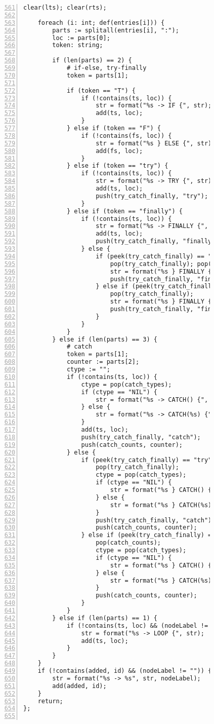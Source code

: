 \begin{figure}[ht!]
\begin{lstlisting}[numbers=left, tabsize=4, escapechar=@, caption={API Usage Mining Analysis},label={lst:aun-code},  firstline = 561, firstnumber = 561, lastline = 621]
	clear(lts); clear(rts);
		
	foreach (i: int; def(entries[i])) {
		parts := splitall(entries[i], ":");
		loc := parts[0];
		token: string;
		
		if (len(parts) == 2) {
			# if-else, try-finally
			token = parts[1];
				
			if (token == "T") {
				if (!contains(ts, loc)) {
					str = format("%s -> IF {", str);
					add(ts, loc);
				}
			} else if (token == "F") {
				if (!contains(fs, loc)) {
					str = format("%s } ELSE {", str);
					add(fs, loc); 
				}
			} else if (token == "try") {
				if (!contains(ts, loc)) {
					str = format("%s -> TRY {", str);
					add(ts, loc);
					push(try_catch_finally, "try");
				}
			} else if (token == "finally") {
				if (!contains(ts, loc)) {
					str = format("%s -> FINALLY {", str);
					add(ts, loc);
					push(try_catch_finally, "finally");
				} else {
					if (peek(try_catch_finally) == "catch") {
						pop(try_catch_finally); pop(catch_counts);
						str = format("%s } FINALLY {", str);
						push(try_catch_finally, "finally");
					} else if (peek(try_catch_finally) == "try") {
					    pop(try_catch_finally);
					    str = format("%s } FINALLY {", str);
					    push(try_catch_finally, "finally");
					}
				}
			} 
		} else if (len(parts) == 3) {
			# catch
			token = parts[1];
			counter := parts[2];
			ctype := "";
			if (!contains(ts, loc)) {
			    ctype = pop(catch_types);
			    if (ctype == "NIL") {
				    str = format("%s -> CATCH() {", str);
			    } else {
			        str = format("%s -> CATCH(%s) {", str, ctype);
			    }
				add(ts, loc);
				push(try_catch_finally, "catch");
				push(catch_counts, counter);
			} else {
				if (peek(try_catch_finally) == "try") {
					pop(try_catch_finally);
					ctype = pop(catch_types);
			        if (ctype == "NIL") {
			            str = format("%s } CATCH() {", str);    
			        } else {
			            str = format("%s } CATCH(%s) {", str, ctype);    
			        }
					push(try_catch_finally, "catch");
					push(catch_counts, counter);
				} else if (peek(try_catch_finally) == "catch" && peek(catch_counts) != counter) {
					pop(catch_counts);
					ctype = pop(catch_types);
			        if (ctype == "NIL") {
			            str = format("%s } CATCH() {", str);    
			        } else {
			            str = format("%s } CATCH(%s) {", str, ctype);    
			        }
					push(catch_counts, counter);
				}
			}
		} else if (len(parts) == 1) {
			if (!contains(ts, loc) && (nodeLabel != "")) {
				str = format("%s -> LOOP {", str);
				add(ts, loc);
			}
		} 
	}
	if (!contains(added, id) && (nodeLabel != "")) {
        str = format("%s -> %s", str, nodeLabel);
        add(added, id);
    }
	return;
};


\end{lstlisting}
\end{figure}
